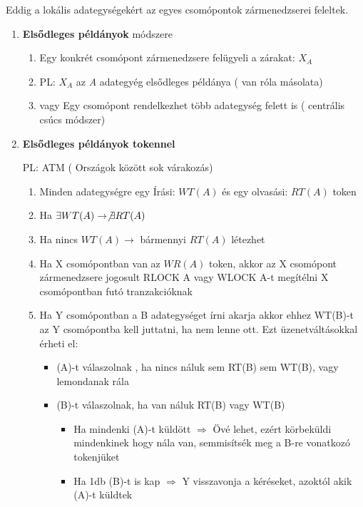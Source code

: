 Eddig a lokális adategységekért az egyes csomópontok zármenedzserei feleltek.
	\begin{enumerate}
		\item \textbf{Elsődleges példányok} módszere

			\begin{enumerate}
				\item Egy konkrét csomópont zármenedzsere felügyeli a zárakat: $X_A$
				\item PL: $X_A$ az \textit{A} adategyég elsődleges példánya ( van róla másolata)
				\item vagy Egy csomópont rendelkezhet több adategység felett is ( centrális csúcs módszer)
			\end{enumerate}

		\item \textbf{Elsődleges példányok tokennel}

			PL: ATM ( Országok között sok várakozás)

			\begin{enumerate}

				\item Minden adategységre egy Írási: $WT(A)$ és egy olvasási: $RT(A)$ token
				\item Ha $\exists WT(A) \rightarrow \not\exists RT(A)$
				\item Ha nincs $WT(A) \rightarrow$ bármennyi $RT(A)$ létezhet
				\item Ha X csomópontban van az $WR(A)$ token, akkor az X csomópont zármenedzsere jogosult RLOCK A vagy WLOCK A-t megítélni X csomópontban futó tranzakcióknak

				\item Ha Y csomópontban a B adategységet írni akarja akkor ehhez WT(B)-t az Y csomópontba kell juttatni, ha nem lenne ott. Ezt üzenetváltásokkal érheti el:
				\begin{itemize}
					\item (A)-t válaszolnak , ha nincs náluk sem RT(B) sem WT(B), vagy lemondanak rála
					\item (B)-t válaszolnak, ha van náluk RT(B) vagy WT(B)\\[-2pt]
					\begin{itemize}
						\item Ha mindenki (A)-t küldött $\Longrightarrow$ Övé lehet, ezért körbeküldi mindenkinek hogy nála van, semmisítsék meg a B-re vonatkozó tokenjüket
						\item Ha 1db (B)-t is kap $\Longrightarrow$ Y visszavonja a kéréseket, azoktól akik (A)-t küldtek
					\end{itemize}
				\end{itemize}


\end{enumerate}
\end{enumerate}
